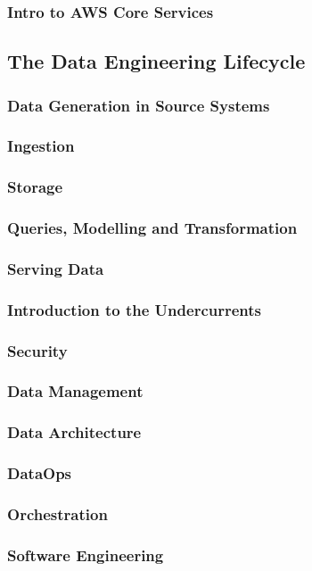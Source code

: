 \subsubsection{Intro to AWS Core Services}

\subsection{The Data Engineering Lifecycle}
\subsubsection{Data Generation in Source Systems}
\subsubsection{Ingestion}
\subsubsection{Storage}
\subsubsection{Queries, Modelling and Transformation}
\subsubsection{Serving Data}
\subsubsection{Introduction to the Undercurrents}
\subsubsection{Security}
\subsubsection{Data Management}
\subsubsection{Data Architecture}
\subsubsection{DataOps}
\subsubsection{Orchestration}
\subsubsection{Software Engineering}
